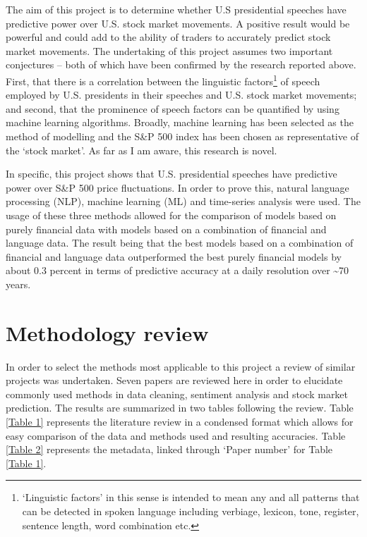 \documentclass[11pt,preprint, authoryear]{elsarticle}
\numberwithin{equation}{section}
\numberwithin{figure}{section}
\numberwithin{table}{section}
\let\rmarkdownfootnote\footnote%
\def\footnote{\protect\rmarkdownfootnote}
\begin{document}
The aim of this project is to determine whether U.S presidential
speeches have predictive power over U.S. stock market movements. A
positive result would be powerful and could add to the ability of
traders to accurately predict stock market movements. The undertaking of
this project assumes two important conjectures -- both of which have
been confirmed by the research reported above. First, that there is a
correlation between the linguistic factors\footnote{`Linguistic factors'
  in this sense is intended to mean any and all patterns that can be
  detected in spoken language including verbiage, lexicon, tone,
  register, sentence length, word combination etc.} of speech employed
by U.S. presidents in their speeches and U.S. stock market movements;
and second, that the prominence of speech factors can be quantified by
using machine learning algorithms. Broadly, machine learning has been
selected as the method of modelling and the S\&P 500 index has been
chosen as representative of the `stock market'. As far as I am aware,
this research is novel.

In specific, this project shows that U.S. presidential speeches have
predictive power over S\&P 500 price fluctuations. In order to prove
this, natural language processing (NLP), machine learning (ML) and
time-series analysis were used. The usage of these three methods allowed
for the comparison of models based on purely financial data with models
based on a combination of financial and language data. The result being
that the best models based on a combination of financial and language
data outperformed the best purely financial models by about 0.3 percent
in terms of predictive accuracy at a daily resolution over
\textasciitilde70 years.

\hypertarget{methodology-review}{%
\section{Methodology review}\label{methodology-review}}

In order to select the methods most applicable to this project a review
of similar projects was undertaken. Seven papers are reviewed here in
order to elucidate commonly used methods in data cleaning, sentiment
analysis and stock market prediction. The results are summarized in two
tables following the review. Table \ref{Table 1} represents the
literature review in a condensed format which allows for easy comparison
of the data and methods used and resulting accuracies. Table
\ref{Table 2} represents the metadata, linked through `Paper number' for
Table \ref{Table 1}.
\end{document}
